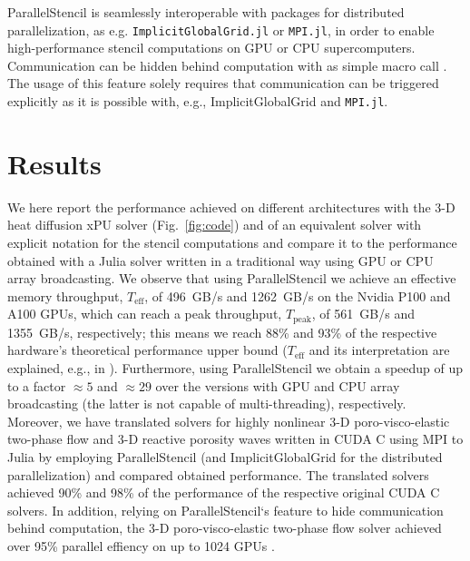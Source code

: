 \documentclass{juliacon}
\begin{document}
ParallelStencil is seamlessly interoperable with packages for distributed parallelization, as e.g. \texttt{ImplicitGlobalGrid.jl} \cite{implicitglobalgrid2022} or \texttt{MPI.jl}, in order to enable high-performance stencil computations on GPU or CPU supercomputers. Communication can be hidden behind computation with as simple macro call \cite{implicitglobalgrid2022}. The usage of this feature solely requires that communication can be triggered explicitly as it is possible with, e.g., ImplicitGlobalGrid and \texttt{MPI.jl}.

\section{Results}
We here report the performance achieved on different architectures with the 3-D heat diffusion xPU solver (Fig.~\ref{fig:code}) and of an equivalent solver with explicit notation for the stencil computations and compare it to the performance obtained with a Julia solver written in a traditional way using GPU or CPU array broadcasting. We observe that using ParallelStencil we achieve an effective memory throughput, $T_\mathrm{eff}$, of 496~GB/s and 1262~GB/s on the Nvidia P100 and A100 GPUs, which can reach a peak throughput, $T_\mathrm{peak}$, of 561~GB/s and 1355~GB/s, respectively; this means we reach 88\% and 93\% of the respective hardware's theoretical performance upper bound ($T_\mathrm{eff}$ and its interpretation are explained, e.g., in \cite{rass2022assessing}). Furthermore, using ParallelStencil we obtain a speedup of up to a factor $\approx 5$ and 
$\approx 29$ over the versions with GPU and CPU array broadcasting (the latter is not capable of multi-threading), respectively.
Moreover, we have translated solvers for highly nonlinear 3-D poro-visco-elastic two-phase flow and 3-D reactive porosity waves written in CUDA C using MPI to Julia by employing ParallelStencil (and ImplicitGlobalGrid for the distributed parallelization) and compared obtained performance. The translated solvers achieved 90\% and 98\% of the performance of the respective original CUDA C solvers. In addition, relying on ParallelStencil`s feature to hide communication behind computation, the 3-D poro-visco-elastic two-phase flow solver achieved over 95\% parallel effiency on up to 1024 GPUs \cite{implicitglobalgrid2022}. 
\end{document}
